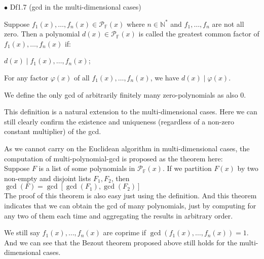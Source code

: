 \documentclass{article}
\begin{document}
\begin{Df}{$\bullet$ Df1.7 (gcd in the multi-dimensional cases)}
    \begin{compactitem}
        \item Suppose $f_1(x), \dots, f_n(x)\in\mathcal{P}_\mathbb{F}(x)$ where $n\in\mathbb{N}^\ast$ and $f_1, \dots, f_n$ are not all zero. Then a polynomial $d(x)\in\mathcal{P}_\mathbb{F}(x)$ is called the greatest common factor of $f_1(x), \dots, f_n(x)$ if:
        \begin{compactenum}
            \item $d(x)\mid f_1(x), \dots, f_n(x)$;
            \item For any factor $\varphi(x)$ of all $f_1(x), \dots, f_n(x)$, we have $d(x)\mid \varphi(x)$.
        \end{compactenum}
        \item We define the only gcd of arbitrarily finitely many zero-polynomials as also $0$.
    \end{compactitem}
\end{Df}

\begin{Rmk}{}
    \begin{compactitem}
        \item This definition is a natural extension to the multi-dimensional cases. \textcolor{Th}{Here we can still clearly confirm the existence and uniqueness (regardless of a non-zero constant multiplier) of the gcd.}
        \item As we cannot carry on the Euclidean algorithm in multi-dimensional cases, the computation of multi-polynomial-gcd is proposed as the theorem here:\\
        \textcolor{Th}{Suppose $F$ is a list of some polynomials in $\mathcal{P}_\mathbb{F}(x)$. If we partition $F(x)$ by two non-empty and disjoint lists $F_1, F_2$, then $\gcd(F) = \gcd[\gcd(F_1), \gcd(F_2)]$}\\
        The proof of this theorem is also easy just using the definition. And this theorem indicates that we can obtain the gcd of many polynomials, just by computing for any two of them each time and aggregating the results in arbitrary order.
        \item \textcolor{Df}{We still say $f_1(x), \dots, f_n(x)$ are coprime if $\gcd(f_1(x), \dots, f_n(x)) = 1$.} And we can see that \textcolor{Th}{the Bezout theorem proposed above still holds for the multi-dimensional cases.}
    \end{compactitem}
\end{Rmk}
\end{document}
